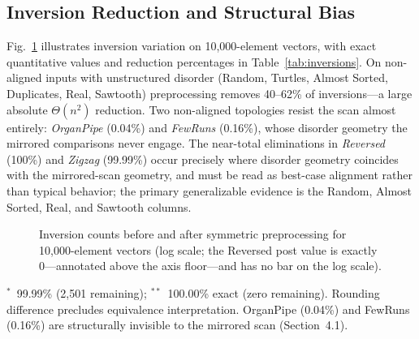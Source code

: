 \documentclass[namedate,webpdf,contemporary,large]{TBench-template}%
\theoremstyle{thmstyleone}%
\theoremstyle{thmstyletwo}%
\theoremstyle{thmstylethree}%
\begin{document}
\subsection{Inversion Reduction and Structural Bias}
Fig.~\ref{fig:inversions} illustrates inversion variation on 10,000-element vectors, with exact quantitative values and reduction percentages in Table~\ref{tab:inversions}. On non-aligned inputs with unstructured disorder (Random, Turtles, Almost Sorted, Duplicates, Real, Sawtooth) preprocessing removes 40--62\% of inversions---a large absolute $\Theta(n^2)$ reduction. Two non-aligned topologies resist the scan almost entirely: \emph{OrganPipe} (0.04\%) and \emph{FewRuns} (0.16\%), whose disorder geometry the mirrored comparisons never engage. The near-total eliminations in \emph{Reversed} (100\%) and \emph{Zigzag} (99.99\%) occur precisely where disorder geometry coincides with the mirrored-scan geometry, and must be read as best-case alignment rather than typical behavior; the primary generalizable evidence is the Random, Almost Sorted, Real, and Sawtooth columns.


\begin{figure}[!t]%
\centering
{}
\caption{Inversion counts before and after symmetric preprocessing for 10,000-element vectors (log scale; the Reversed post value is exactly 0---annotated above the axis floor---and has no bar on the log scale).}\label{fig:inversions}
\end{figure}


\begin{table}[!t]
\caption{Inversion reduction by symmetric preprocessing on 10,000-element vectors (mean of 50 paired-pool vectors; same seed as Table~\ref{tab:times}).\label{tab:inversions}}%

\begin{tablenotes}%
\item $^{*}$~99.99\% (2,501 remaining); $^{**}$~100.00\% exact (zero remaining). Rounding difference precludes equivalence interpretation. OrganPipe (0.04\%) and FewRuns (0.16\%) are structurally invisible to the mirrored scan (Section~4.1).
\end{tablenotes}
\end{table}
\end{document}
